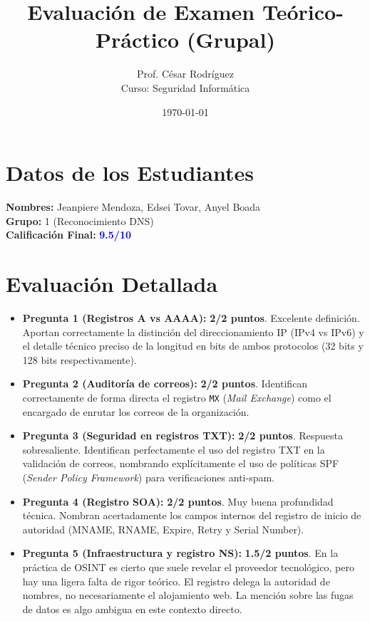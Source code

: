\documentclass[12pt,a4paper]{article}
\title{Evaluación de Examen Teórico-Práctico (Grupal)}
\author{Prof. César Rodríguez \\ \small Curso: Seguridad Informática}
\date{\today}
\begin{document}
\maketitle

\section*{Datos de los Estudiantes}
\textbf{Nombres:} Jeanpiere Mendoza, Edsei Tovar, Anyel Boada \\
\textbf{Grupo:} 1 (Reconocimiento DNS) \\
\textbf{Calificación Final:} \textbf{\textcolor{blue}{9.5/10}}

\section*{Evaluación Detallada}

\begin{itemize}[label=$\bullet$]
    \item \textbf{Pregunta 1 (Registros A vs AAAA):} \textbf{2/2 puntos}. Excelente definición. Aportan correctamente la distinción del direccionamiento IP (IPv4 vs IPv6) y el detalle técnico preciso de la longitud en bits de ambos protocolos (32 bits y 128 bits respectivamente).
    
    \item \textbf{Pregunta 2 (Auditoría de correos):} \textbf{2/2 puntos}. Identifican correctamente de forma directa el registro \texttt{MX} (\textit{Mail Exchange}) como el encargado de enrutar los correos de la organización.
    
    \item \textbf{Pregunta 3 (Seguridad en registros TXT):} \textbf{2/2 puntos}. Respuesta sobresaliente. Identifican perfectamente el uso del registro TXT en la validación de correos, nombrando explícitamente el uso de políticas SPF (\textit{Sender Policy Framework}) para verificaciones anti-spam.
    
    \item \textbf{Pregunta 4 (Registro SOA):} \textbf{2/2 puntos}. Muy buena profundidad técnica. Nombran acertadamente los campos internos del registro de inicio de autoridad (MNAME, RNAME, Expire, Retry y Serial Number).
    
    \item \textbf{Pregunta 5 (Infraestructura y registro NS):} \textbf{1.5/2 puntos}. En la práctica de OSINT es cierto que suele revelar el proveedor tecnológico, pero hay una ligera falta de rigor teórico. El registro delega la autoridad de nombres, no necesariamente el alojamiento web. La mención sobre las fugas de datos es algo ambigua en este contexto directo.
\end{itemize}
\end{document}
